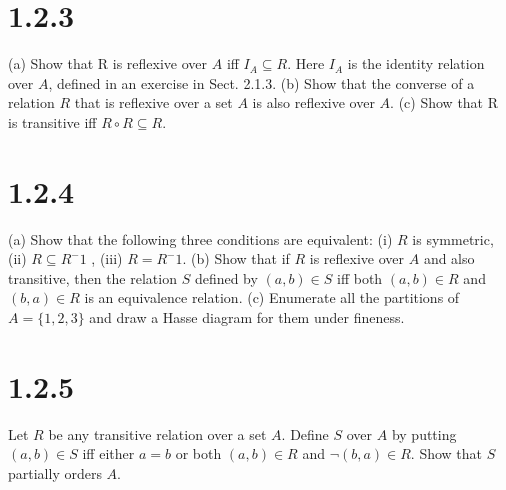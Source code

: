 \documentclass{article}
\begin{document}
\section*{1.2.3}
(a) Show that R is reflexive over $A$ iff $I_A \subseteq R$. Here $I_A$ is the identity relation over $A$, defined in an exercise in Sect. 2.1.3.
(b) Show that the converse of a relation $R$ that is reflexive over a set $A$ is also reflexive over $A$.
(c) Show that R is transitive iff $R \circ R \subseteq R$.
\section*{1.2.4}
(a) Show that the following three conditions are equivalent: (i) $R$ is symmetric, (ii) $R \subseteq R^-1$ , (iii) $R = R^-1$.
(b) Show that if $R$ is reflexive over $A$ and also transitive, then the relation $S$ defined by $(a,b) \in S$ iff both $(a,b) \in R$ and $(b,a) \in R$ is an equivalence relation.
(c) Enumerate all the partitions of $A=\{ 1, 2, 3 \}$ and draw a Hasse diagram for them under fineness.
\section*{1.2.5}
Let $R$ be any transitive relation over a set $A$. Define $S$ over $A$ by putting $(a,b) \in S$ iff either $a = b$ or both $(a,b) \in R$ and $\neg (b,a) \in R$. Show that $S$ partially orders $A$.
\end{document}
